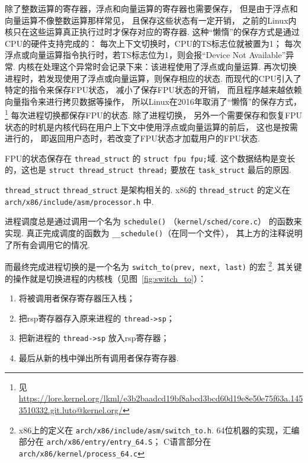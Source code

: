 除了整数运算的寄存器，浮点和向量运算的寄存器也需要保存，
但是由于浮点和向量运算不像整数运算那样常见，
且保存这些状态有一定开销，
之前的Linux内核只在这些运算真正执行过时才保存对应的寄存器.
这种“懒惰”的保存方式是通过CPU的硬件支持完成的：
每次上下文切换时，CPU的TS标志位就被置为1；
每次浮点或向量运算指令执行时，若TS标志位为1，则会报“Device Not Available”异常.
内核在处理这个异常时会记录下来：该进程使用了浮点或向量运算.
再次切换进程时，若发现使用了浮点或向量运算，则保存相应的状态.\cite{bovet2005understanding}
而现代的CPU引入了特定的指令来保存FPU状态，
减小了保存FPU状态的开销，
而且程序越来越依赖向量指令来进行拷贝数据等操作，
所以Linux在2016年取消了“懒惰”的保存方式，
\footnote{见 \url{https://lore.kernel.org/lkml/e3b2baadcd19bf8abcd3bcd60d19e8e50e75f63a.1453510332.git.luto@kernel.org/}}
每次进程切换都保存FPU的状态.
除了进程切换，
另外一个需要保存和恢复FPU状态的时机是内核代码在用户上下文中使用浮点或向量运算的前后，
这也是按需进行的，
即返回用户态时，若改变了FPU状态才加载用户的FPU状态.

FPU的状态保存在 \lstinline{thread_struct} 的 \lstinline{struct fpu fpu;}域.
这个数据结构是变长的，这也是 \lstinline{struct thread_struct thread;}
要放在 \lstinline{task_struct} 最后的原因.

\begin{readsrcbox}{\lstinline{thread_struct}}
	\lstinline{thread_struct} 是架构相关的.
	x86的 \lstinline{thread_struct} 的定义在 \lstinline{arch/x86/include/asm/processor.h} 中.

	进程调度总是通过调用一个名为 \lstinline{schedule()}
	（\lstinline{kernel/sched/core.c}） 的函数来实现.
	真正完成调度的函数为 \lstinline{__schedule()}（在同一个文件），
	其上方的注释说明了所有会调用它的情况.

	而最终完成进程切换的是一个名为 \lstinline{switch_to(prev, next, last)} 的宏
	\footnote{x86上的定义在 \lstinline{arch/x86/include/asm/switch_to.h}.
		64位机器的实现，汇编部分在 \lstinline{arch/x86/entry/entry_64.S}；
		C语言部分在 \lstinline{arch/x86/kernel/process_64.c}}.
	其关键的操作就是切换进程的内核栈（见图~\ref{fig:switch_to}）：
	\begin{enumerate}
		\item 将被调用者保存寄存器压入栈；
		\item 把rsp寄存器存入原来进程的 \lstinline{thread->sp}；
		\item 把新进程的 \lstinline{thread->sp} 放入rsp寄存器；
		\item 最后从新的栈中弹出所有调用者保存寄存器.
	\end{enumerate}
\end{readsrcbox}

